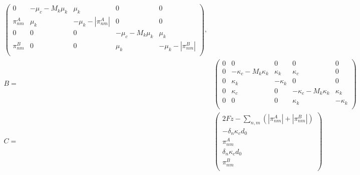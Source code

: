\documentclass[a4paper,12pt]{article}
\begin{document}
\begin{itemize}
\begin{equation}
\begin{aligned}
\begin{pmatrix}
      
      0 &  -\mu_c - M_k \mu_k& \mu_k & 0 & 0\\
      \pi_{nm}^A & \mu_k & - \mu_k - |\pi_{nm}^A| & 0& 0\\
      0&0&0 & -\mu_c - M_k \mu_k & \mu_k\\
      \pi_{nm}^B & 0&0 & \mu_k & - \mu_k - |\pi_{nm}^B| \\
    \end{pmatrix}, \\
    B = &%
    \begin{pmatrix}
      0 & 0&0&0&0\\
      0 & - \kappa_c - M_k \kappa_k & \kappa_k &%
      \kappa_c & 0 \\
      0 & \kappa_k & -\kappa_k & 0&0\\
      0 & \kappa_c & 0 &%
      -\kappa_c - M_k \kappa_k & \kappa_k \\
      0&0&0 & \kappa_k & - \kappa_k\\
    \end{pmatrix}\\
    C = &%
    \begin{pmatrix}
      2Fz - \sum_{n,m}(|\pi_{nm}^A| + |\pi_{nm}^B|) \\
      - \delta_n \kappa_c d_0\\
      \pi_{nm}^A\\
      \delta_n \kappa_c d_0\\
      \pi_{nm}^B\\
    \end{pmatrix}
\end{aligned}
\end{equation}


\end{itemize}
\end{document}
